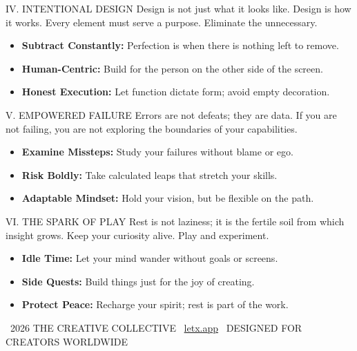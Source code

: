 \documentclass[12pt]{article}
\begin{document}
\hfill
\begin{minipage}[t]{0.48\textwidth}
  \begin{posterbox}{IV. INTENTIONAL DESIGN}
    Design is not just what it looks like. Design is how it works. Every element must serve a purpose. Eliminate the unnecessary.
    \begin{itemize}
      \item \textbf{Subtract Constantly:} Perfection is when there is nothing left to remove.
      \item \textbf{Human-Centric:} Build for the person on the other side of the screen.
      \item \textbf{Honest Execution:} Let function dictate form; avoid empty decoration.
    \end{itemize}
  \end{posterbox}
  
  \vspace{1.2cm}
  
  \begin{posterbox}{V. EMPOWERED FAILURE}
    Errors are not defeats; they are data. If you are not failing, you are not exploring the boundaries of your capabilities.
    \begin{itemize}
      \item \textbf{Examine Missteps:} Study your failures without blame or ego.
      \item \textbf{Risk Boldly:} Take calculated leaps that stretch your skills.
      \item \textbf{Adaptable Mindset:} Hold your vision, but be flexible on the path.
    \end{itemize}
  \end{posterbox}

  \vspace{1.2cm}

  \begin{posterbox}{VI. THE SPARK OF PLAY}
    Rest is not laziness; it is the fertile soil from which insight grows. Keep your curiosity alive. Play and experiment.
    \begin{itemize}
      \item \textbf{Idle Time:} Let your mind wander without goals or screens.
      \item \textbf{Side Quests:} Build things just for the joy of creating.
      \item \textbf{Protect Peace:} Recharge your spirit; rest is part of the work.
    \end{itemize}
  \end{posterbox}
\end{minipage}

\vfill

\begin{center}
  {\color{primary!50}\small 
    \faCopyright\ 2026 THE CREATIVE COLLECTIVE \quad\textbullet\quad 
    \faGlobe\ \href{https://letx.app}{letx.app} \quad\textbullet\quad 
    \faHeart\ DESIGNED FOR CREATORS WORLDWIDE
  }
\end{center}
\end{document}
